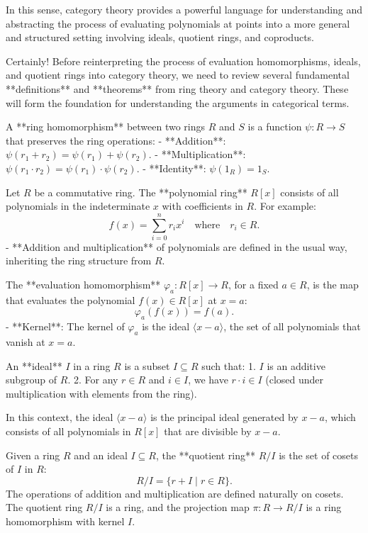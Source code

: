 \documentclass[11pt,openany]{article}
\begin{document}
In this sense, category theory provides a powerful language for understanding and abstracting the process of evaluating polynomials at points into a more general and structured setting involving ideals, quotient rings, and coproducts.

\newpage

Certainly! Before reinterpreting the process of evaluation homomorphisms, ideals, and quotient rings into category theory, we need to review several fundamental **definitions** and **theorems** from ring theory and category theory. These will form the foundation for understanding the arguments in categorical terms.


A **ring homomorphism** between two rings \( R \) and \( S \) is a function \( \psi: R \to S \) that preserves the ring operations:
- **Addition**: \( \psi(r_1 + r_2) = \psi(r_1) + \psi(r_2) \).
- **Multiplication**: \( \psi(r_1 \cdot r_2) = \psi(r_1) \cdot \psi(r_2) \).
- **Identity**: \( \psi(1_R) = 1_S \).

Let \( R \) be a commutative ring. The **polynomial ring** \( R[x] \) consists of all polynomials in the indeterminate \( x \) with coefficients in \( R \). For example:
\[
f(x) = \sum_{i=0}^{n} r_i x^i \quad \text{where} \quad r_i \in R.
\]
- **Addition and multiplication** of polynomials are defined in the usual way, inheriting the ring structure from \( R \).

The **evaluation homomorphism** \( \varphi_a: R[x] \to R \), for a fixed \( a \in R \), is the map that evaluates the polynomial \( f(x) \in R[x] \) at \( x = a \):
\[
\varphi_a(f(x)) = f(a).
\]
- **Kernel**: The kernel of \( \varphi_a \) is the ideal \( \langle x - a \rangle \), the set of all polynomials that vanish at \( x = a \).

An **ideal** \( I \) in a ring \( R \) is a subset \( I \subseteq R \) such that:
1. \( I \) is an additive subgroup of \( R \).
2. For any \( r \in R \) and \( i \in I \), we have \( r \cdot i \in I \) (closed under multiplication with elements from the ring).

In this context, the ideal \( \langle x - a \rangle \) is the principal ideal generated by \( x - a \), which consists of all polynomials in \( R[x] \) that are divisible by \( x - a \).

Given a ring \( R \) and an ideal \( I \subseteq R \), the **quotient ring** \( R/I \) is the set of cosets of \( I \) in \( R \):
\[
R/I = \{ r + I \mid r \in R \}.
\]
The operations of addition and multiplication are defined naturally on cosets. The quotient ring \( R/I \) is a ring, and the projection map \( \pi: R \to R/I \) is a ring homomorphism with kernel \( I \).
\end{document}
